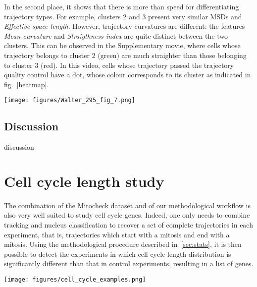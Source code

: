 In the second place, it shows that there is more than speed for differentiating trajectory types. For example, clusters 2 and 3 present very similar MSDs and \textit{Effective space length}. However, trajectory curvatures are different: the features \textit{Mean curvature} and \textit{Straigthness index} are quite distinct between the two clusters. This can be observed in the Supplementary movie, where cells whose trajectory belongs to cluster 2 (green) are much straighter than those belonging to cluster 3 (red). In this video, cells whose trajectory passed the trajectory quality control have a dot, whose colour corresponds to its cluster as indicated in fig.~\ref{heatmap}.

\begin{figure*}[t!]
\centerline{\texttt{[image: figures/Walter\_295\_fig\_7.png]}}
\caption{Characterization of our ontology of trajectories. Each column is a single cell trajectory ; trajectories are grouped by cluster label. 1,000 trajectories were randomly selected per trajectory cluster.}
\label{heatmap}
\end{figure*}
\subsection{Discussion}
discussion\clearpage
\section{Cell cycle length study}
\label{sec:cellcycle}
\paragraph*{} The combination of the Mitocheck dataset and of our methodological workflow is also very well suited to study cell cycle genes. Indeed, one only needs to combine tracking and nucleus classification to recover a set of complete trajectories in each experiment, that is, trajectories which start with a mitosis and end with a mitosis. Using the methodological procedure described in~\ref{sec:stats}, it is then possible to detect the experiments in which cell cycle length distribution is significantly different than that in control experiments, resulting in a list of genes.
\begin{figure*}[ht!]
\centerline{\texttt{[image: figures/cell\_cycle\_examples.png]}}
\caption{Examples of object divisions from the Mitocheck dataset}
\label{cellcycle2}
\end{figure*}
